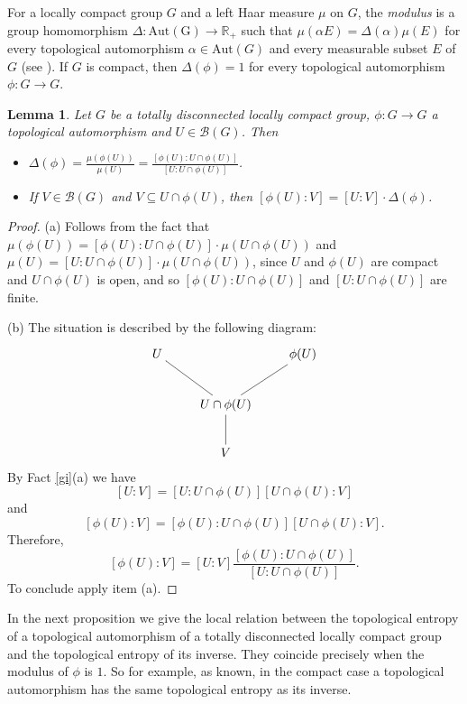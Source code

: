 \documentclass[11pt]{article}
\newtheorem{lemma}[theorem]{Lemma}
\theoremstyle{definition}
\newcommand{\R}{\mathbb R}
\def\Aut{\mathrm{Aut}}
\numberwithin{equation}{section}
\begin{document}
For a locally compact group $G$ and a left Haar measure $\mu$ on $G$, the \emph{modulus} is a group homomorphism $\Delta:\mathrm{Aut(G)}\to\R_+$ such that $\mu(\alpha E)=\Delta(\alpha)\mu(E)$ for every topological automorphism $\alpha\in \Aut(G)$ and every measurable subset $E$ of $G$ (see \cite{HR}). If $G$ is compact, then $\Delta(\phi)=1$ for every topological automorphism $\phi:G\to G$.

\begin{lemma}\label{Delta}
Let $G$ be a totally disconnected locally compact group, $\phi:G\to G$ a topological automorphism and $U\in\mathcal B(G)$. Then
\begin{itemize}
\item[(a)]  $\Delta(\phi)=\frac{\mu(\phi(U))}{\mu(U)}=\frac{[\phi(U):U\cap\phi(U)]}{[U:U\cap\phi(U)]}$.
\item[(b)] If $V\in\mathcal B(G)$ and $V\subseteq U\cap \phi(U)$, then $[\phi(U):V]=[U:V]\cdot\Delta(\phi)$.
\end{itemize}
\end{lemma}
\begin{proof}
(a) Follows from the fact that $\mu(\phi(U))=[\phi(U):U\cap \phi(U)]\cdot\mu(U\cap\phi(U))$ and $\mu(U)=[U:U\cap\phi(U)]\cdot \mu(U\cap\phi(U))$, since $U$ and $\phi(U)$ are compact and $U\cap\phi(U)$ is open, and so $[\phi(U):U\cap\phi(U)]$ and $[U:U\cap\phi(U)]$ are finite.

\smallskip
(b) The situation is described by the following diagram:
$$\xymatrix{
U \ar@{-}[dr]& & \phi(U)\ar@{-}[dl] \\
& U\cap\phi(U)\ar@{-}[d] \\
& V &
}$$
By Fact \ref{gi}(a) we have $$[U:V]=[U:U\cap\phi(U)][U\cap\phi(U):V]$$ and $$[\phi(U):V]=[\phi(U):U\cap\phi(U)][U\cap\phi(U):V].$$ Therefore, $$[\phi(U):V]=[U:V]\frac{[\phi(U):U\cap\phi(U)]}{[U:U\cap\phi(U)]}.$$
To conclude apply item (a).
\end{proof}

In the next proposition we give the local relation between the topological entropy of a topological automorphism of a totally disconnected locally compact group and the topological entropy of its inverse. They coincide precisely when the modulus of $\phi$ is $1$. So for example, as known, in the compact case a topological automorphism has the same topological entropy as its inverse.
\end{document}
